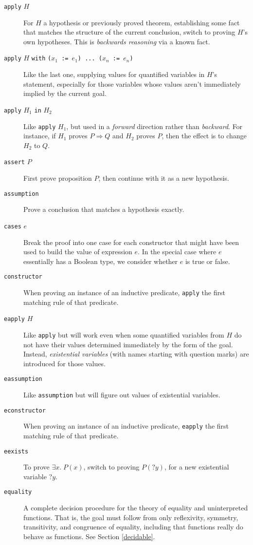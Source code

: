 \documentclass{amsbook}
\theoremstyle{definition}
\theoremstyle{remark}
\numberwithin{section}{chapter}
\numberwithin{equation}{chapter}
\begin{document}
\begin{description}
  \item[\texttt{apply} $H$] For $H$ a hypothesis or previously proved theorem, establishing some fact that matches the structure of the current conclusion, switch to proving $H$'s own hypotheses.  This is \emph{backwards reasoning} via a known fact.
  \item[\texttt{apply} $H$ \texttt{with} \texttt{(}$x_1$\texttt{ := }$e_1$\texttt{) ... (}$x_n$\texttt{ := }$e_n$\texttt{)}] Like the last one, supplying values for quantified variables in $H$'s statement, especially for those variables whose values aren't immediately implied by the current goal.
  \item[\texttt{apply} $H_1$ \texttt{in} $H_2$] Like \texttt{apply} $H_1$, but used in a \emph{forward} direction rather than \emph{backward}.  For instance, if $H_1$ proves $P \Rightarrow Q$ and $H_2$ proves $P$, then the effect is to change $H_2$ to $Q$.
  \item[\texttt{assert} $P$] First prove proposition $P$, then continue with it as a new hypothesis.
  \item[\texttt{assumption}] Prove a conclusion that matches a hypothesis exactly.
  \item[\texttt{cases} $e$] Break the proof into one case for each constructor that might have been used to build the value of expression $e$.  In the special case where $e$ essentially has a Boolean type, we consider whether $e$ is true or false.
  \item[\texttt{constructor}] When proving an instance of an inductive predicate, \texttt{apply} the first matching rule of that predicate.
  \item[\texttt{eapply} $H$] Like \texttt{apply} but will work even when some quantified variables from $H$ do not have their values determined immediately by the form of the goal.  Instead, \emph{existential variables} (with names starting with question marks) are introduced for those values.
  \item[\texttt{eassumption}] Like \texttt{assumption} but will figure out values of existential variables.
  \item[\texttt{econstructor}] When proving an instance of an inductive predicate, \texttt{eapply} the first matching rule of that predicate.
  \item[\texttt{eexists}] To prove $\exists x. \; P(x)$, switch to proving $P(?y)$, for a new existential variable $?y$.
  \item[\texttt{equality}] A complete decision procedure for the theory of equality and uninterpreted functions.  That is, the goal must follow from only reflexivity, symmetry, transitivity, and congruence of equality, including that functions really do behave as functions.  See Section \ref{decidable}.

\end{description}
\end{document}
